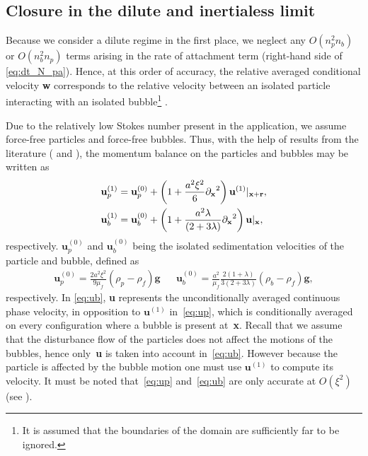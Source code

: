 \subsection{Closure in the dilute and inertialess limit}

Because we consider a dilute regime in the first place, we neglect any $O(n_p^2n_b)$ or $O(n_b^2n_p)$ terms arising in the rate of attachment term (right-hand side of \eqref{eq:dt_N_pa}).
Hence, at this order of accuracy, the relative averaged conditional velocity \textbf{w} corresponds to the relative velocity between an isolated particle interacting with an isolated bubble\footnote{It is assumed that the boundaries of the domain are sufficiently far to be ignored.} \citep{hinch1977averaged,loewenberg1994flotation}. 

Due to the relatively low Stokes number present in the application, we assume force-free particles and force-free bubbles.  
Thus, with the help of results from the literature (\citet{batchelor1972sedimentation} and \citet[Chapter 8]{kim2013microhydrodynamics}), the momentum balance on the particles and bubbles may be written as
\begin{align}
\label{eq:up}
    \textbf{u}_p^{(1)}
    &=
    \textbf{u}_p^{(0)}
    + \left(1 +\frac{a^2\xi^2}{6} \pddx^2\right) \textbf{u}^{(1)}|_{\textbf{x}+\textbf{r}},\\
    \label{eq:ub}
    \textbf{u}_b^{(1)}
    &=
    \textbf{u}_b^{(0)}
    + \left(1 +\frac{a^2\lambda}{(2+3\lambda)} \pddx^2\right) \textbf{u}|_{\textbf{x}},
\end{align}
respectively. 
$\textbf{u}_p^{(0)}$ and $\textbf{u}_b^{(0)}$ being the isolated sedimentation velocities of the particle and bubble, defined as
\begin{align}
    \textbf{u}_p^{(0)} 
    =
    \frac{2a^2\xi^2}{9\mu_f}(\rho_p - \rho_f)\textbf{g}
    &&
    \textbf{u}_b^{(0)}
    =
    \frac{a^2}{\mu_f}\frac{2(1+\lambda)}{3(2+3\lambda)}(\rho_b - \rho_f)\textbf{g},
\end{align}
respectively. 
In \eqref{eq:ub}, \textbf{u} represents the unconditionally averaged continuous phase velocity, in opposition to $\textbf{u}^{(1)}$ in~\eqref{eq:up}, which is conditionally averaged on every configuration where a bubble is present at~\textbf{x}. 
Recall that we assume that the disturbance flow of the particles does not affect the motions of the bubbles, hence only~\textbf{u} is taken into account in~\eqref{eq:ub}. 
However because the particle is affected by the bubble motion one must use $\textbf{u}^{(1)}$ to compute its velocity. 
It must be noted that~\eqref{eq:up} and~\eqref{eq:ub} are only accurate at $O(\xi^2)$ (see \citet[section 4.6]{batchelor1972sedimentation}). 


